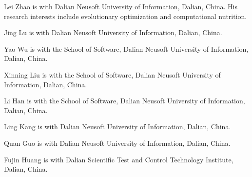 \documentclass{ieeeaccess}
\begin{document}
\begin{IEEEbiographynophoto}{Lei Zhao}
is with Dalian Neusoft University of Information, Dalian, China. His research interests include evolutionary optimization and computational nutrition.
\end{IEEEbiographynophoto}
\begin{IEEEbiographynophoto}{Jing Lu}
is with Dalian Neusoft University of Information, Dalian, China.
\end{IEEEbiographynophoto}
\begin{IEEEbiographynophoto}{Yao Wu}
is with the School of Software, Dalian Neusoft University of Information, Dalian, China.
\end{IEEEbiographynophoto}
\begin{IEEEbiographynophoto}{Xinning Liu}
is with the School of Software, Dalian Neusoft University of Information, Dalian, China.
\end{IEEEbiographynophoto}
\begin{IEEEbiographynophoto}{Li Han}
is with the School of Software, Dalian Neusoft University of Information, Dalian, China.
\end{IEEEbiographynophoto}
\begin{IEEEbiographynophoto}{Ling Kang}
is with Dalian Neusoft University of Information, Dalian, China.
\end{IEEEbiographynophoto}
\begin{IEEEbiographynophoto}{Quan Guo}
is with Dalian Neusoft University of Information, Dalian, China.
\end{IEEEbiographynophoto}
\begin{IEEEbiographynophoto}{Fujin Huang}
is with Dalian Scientific Test and Control Technology Institute, Dalian, China.
\end{IEEEbiographynophoto}

\EOD
\end{document}
